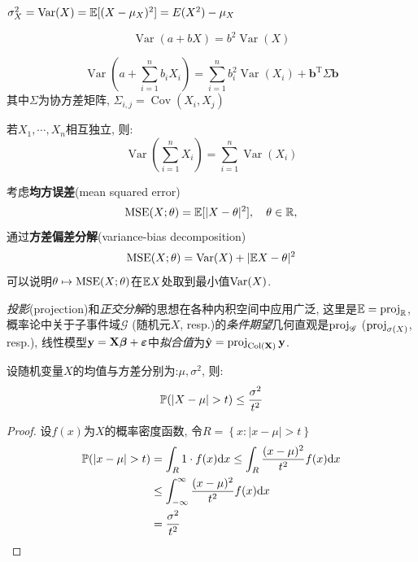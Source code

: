 \begin{theorem}
    $\sigma^2_X=\operatorname{Var}(X)=\E[(X-\mu_X)^2]=E(X^2)-\mu_X$
\end{theorem}

\begin{theorem}
    \[ \operatorname{Var}(a+bX)=b^2\operatorname{Var}(X) \]
\end{theorem}

\begin{theorem}
    \[ \operatorname{Var}(a+\sum_{i=1}^n b_i X_i)=\sum_{i=1}^n b_i^2 \operatorname{Var}(X_i)+\mathbf{b}^{\mathrm{T}} \Sigma \mathbf{b}\]
    其中$\Sigma$为协方差矩阵, $\Sigma_{i,j}=\operatorname{Cov}(X_i,X_j)$
\end{theorem}

\begin{theorem}
    若$X_1,\cdots ,X_n$相互独立, 则:
    \[ \operatorname{Var}(\sum_{i=1}^n X_i)=\sum_{i=1}^n\operatorname{Var}( X_i) \]
\end{theorem}

考虑\textbf{均方误差}(mean squared error)
\[ \MSE(X;\theta) = \E[|X-\theta|^{2}], \quad \theta\in\R, \]
通过\textbf{方差偏差分解}(variance-bias decomposition)
\[ \MSE(X;\theta) = \Var(X) + |\E{X}-\theta|^{2} \]
可以说明$\theta\mapsto\MSE(X;\theta)$在$\E{X}$处取到最小值$\Var(X)$.

\emph{投影}(projection)和\emph{正交分解}的思想在各种内积空间中应用广泛, 这里是$\E = \proj{}{\R}$, 概率论中关于子事件域$\mathscr{G}$ (随机元$X$, resp.)的\emph{条件期望}几何直观是$\proj{}{\mathscr{G}}$ ($\proj{}{\sigma(X)}$, resp.), 线性模型$\mathbf{y} = \mathbf{X}\bm{\beta} + \bm{\e}$中\emph{拟合值}为$\hat{\mathbf{y}} = \proj{\mathbf{y}}{\operatorname{Col}(\mathbf{X})}$.

\begin{theorem}[Chebyshev不等式]
    设随机变量$X$的均值与方差分别为:$\mu, \sigma^2$, 则:
    \[ \P(\left| X-\mu \right| >t)\le \frac{\sigma^{2}}{t^{2}} \]
\end{theorem}

\begin{proof}
    设$f(x)$为$X$的概率密度函数, 令$R=\left\{ x:|x-\mu|>t \right\} $
    \begin{align*}
        \P(|x-\mu|>t) & = \int_R 1 \cdot  f(x)\d x \le \int_R \frac{(x-\mu)^2}{t^{2}}f(x) \d x \\
                      & \le \int_{-\infty}^{\infty}\frac{(x-\mu)^2}{t^{2}}f(x) \d x            \\
                      & = \frac{\sigma^{2}}{t^{2}}
    \end{align*}
\end{proof}

